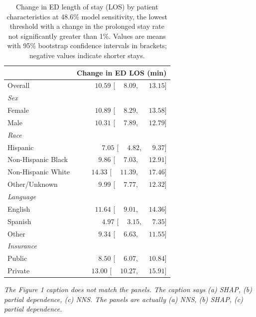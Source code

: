  \begin{table}[htbp]
\centering
\small
\caption{Change in ED length of stay (LOS) by patient characteristics at 48.6\% model sensitivity, the lowest threshold with a change in the prolonged stay rate not significantly greater than 1\%. Values are means with 95\% bootstrap confidence intervals in brackets; negative values indicate shorter stays.}
\label{tab:los_demographics_0.01}
\begin{tabular}{lr}
\toprule
 & Change in ED LOS (min) \\
\midrule
Overall & $\phantom{-}10.59$ [$\phantom{-}8.09$, $\phantom{-}13.15$] \\
\addlinespace
{\textit{Sex}} & \\
\quad Female & $\phantom{-}10.89$ [$\phantom{-}8.29$, $\phantom{-}13.58$] \\
\quad Male & $\phantom{-}10.31$ [$\phantom{-}7.89$, $\phantom{-}12.79$] \\
\addlinespace
{\textit{Race}} & \\
\quad Hispanic & $\phantom{-}7.05$ [$\phantom{-}4.82$, $\phantom{-}9.37$] \\
\quad Non-Hispanic Black & $\phantom{-}9.86$ [$\phantom{-}7.03$, $\phantom{-}12.91$] \\
\quad Non-Hispanic White & $\phantom{-}14.33$ [$\phantom{-}11.39$, $\phantom{-}17.46$] \\
\quad Other/Unknown & $\phantom{-}9.99$ [$\phantom{-}7.77$, $\phantom{-}12.32$] \\
\addlinespace
{\textit{Language}} & \\
\quad English & $\phantom{-}11.64$ [$\phantom{-}9.01$, $\phantom{-}14.36$] \\
\quad Spanish & $\phantom{-}4.97$ [$\phantom{-}3.15$, $\phantom{-}7.35$] \\
\quad Other & $\phantom{-}9.34$ [$\phantom{-}6.63$, $\phantom{-}11.55$] \\
\addlinespace
{\textit{Insurance}} & \\
\quad Public & $\phantom{-}8.50$ [$\phantom{-}6.07$, $\phantom{-}10.84$] \\
\quad Private & $\phantom{-}13.00$ [$\phantom{-}10.27$, $\phantom{-}15.91$] \\
\bottomrule
\end{tabular}
\end{table}
\textit{
     The Figure 1 caption does not match the panels. The caption says (a) SHAP, (b) partial dependence, (c) NNS. The panels are actually (a) NNS, (b) SHAP, (c) partial dependence.}

